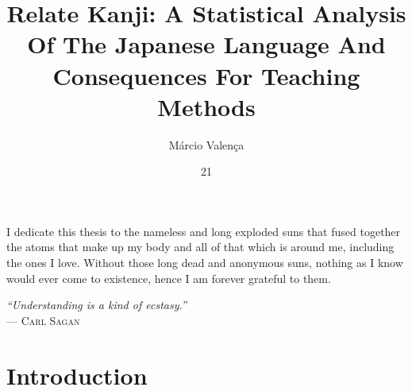 \documentclass[tg, eng]{ita}    %
\author{Márcio Valença}{Ramos}
\title{Relate Kanji: A Statistical Analysis Of The Japanese Language And Consequences For Teaching Methods}
\date{21}{DECEMBER}{2016}
\begin{document}
\maketitle

\begin{itadedication}
I dedicate this thesis to the nameless and long exploded suns that fused together the atoms that make up my body and all of that which is around me, including the ones I love. Without those long dead and anonymous suns, nothing as I know would ever come to existence, hence I am forever grateful to them.
\end{itadedication}

\begin{itathanks}

\end{itathanks}

\thispagestyle{empty}
\ifhyperref{}\fi
\begin{flushright}
\begin{spacing}{1}
\mbox{}\vfill
{\sffamily\itshape
``Understanding is a kind of ecstasy.''\\}
--- \textsc{Carl Sagan}
\end{spacing}
\end{flushright}

%

\begin{englishabstract}

\end{englishabstract}

\listoffigures %

\listoftables %



\tableofcontents

\mainmatter

\chapter{Introduction}\label{chap:intro}

\end{document}
